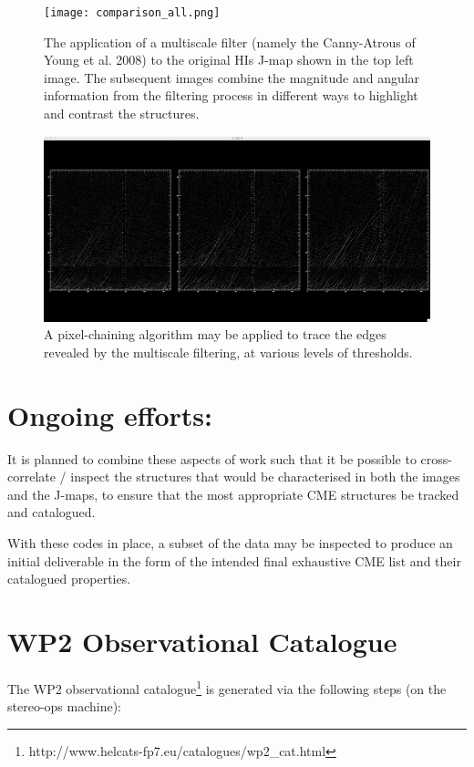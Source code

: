 \documentclass[12pt, a4paper, oneside]{article}
\begin{document}
\begin{figure}[]
\centering
\texttt{[image: comparison\_all.png]}
\caption{The application of a multiscale filter (namely the Canny-Atrous of Young et al. 2008) to the original HIs J-map shown in the top left image. The subsequent images combine the magnitude and angular information from the filtering process in different ways to highlight and contrast the structures.}
\label{comparison_all}
\end{figure}

\begin{figure}[]
\centering
\includegraphics[width=\textwidth]{edges_thr.png}
\caption{A pixel-chaining algorithm may be applied to trace the edges revealed by the multiscale filtering, at various levels of thresholds.}
\label{edges_thr}
\end{figure}


\section{Ongoing efforts:}

It is planned to combine these aspects of work such that it be possible to cross-correlate / inspect the structures that would be characterised in both the images and the J-maps, to ensure that the most appropriate CME structures be tracked and catalogued.

With these codes in place, a subset of the data may be inspected to produce an initial deliverable in the form of the intended final exhaustive CME list and their catalogued properties.


\section*{\sc WP2 Observational Catalogue}

The WP2 observational catalogue\footnote{http://www.helcats-fp7.eu/catalogues/wp2\_cat.html} is generated via the following steps (on the stereo-ops machine):
\end{document}
